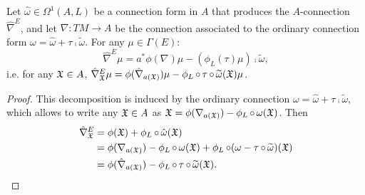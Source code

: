 \begin{proposition}\label{propositionDecompositionFormActionMatterAConnection}
Let $\hat \omega \in \Omega^1(A, L)$ be a connection form in $A$ that produces the $A$-connection $\hat \nabla^E$, and let $\nabla: TM \to A$ be the connection associated to the ordinary connection form $\omega = \hat \omega + \tau \comp \tilde \omega$. For any $\mu \in \Gamma(E)$:
\begin{equation}
    \hat \nabla^E \mu = a^* \phi(\nabla)\mu - (\phi_L(\tau) \mu)\comp \tilde \omega,
\end{equation}
i.e. for any $\mathfrak{X} \in A$, $\hat \nabla^E_{\oid X} \mu = \phi(\hat \nabla_{a(\oid X)})\mu - \phi_L \comp \tau \comp \tilde \omega(\oid X) \mu$.
\end{proposition}
\begin{proof}
This decomposition is induced by the ordinary connection $\omega = \hat \omega + \tau \comp \tilde \omega$, which allows to write any $\mathfrak{X} \in A$ as $\oid X = \phi(\nabla_{a(\oid X)}) - \phi_L \comp \omega(\oid X)$. Then 
\begin{align*}
    \hat \nabla^E_{\oid X} 
      &= \phi(\oid X) + \phi_L \comp \hat \omega(\oid X)\\
      &= \phi(\nabla_{a(\oid X)}) - \phi_L \comp \omega(\oid X) + \phi_L \comp (\omega - \tau \comp \tilde \omega)(\oid X)\\
      &= \phi(\hat \nabla_{a(\oid X)}) - \phi_L \comp \tau \comp \tilde \omega(\oid X).
\end{align*}
\end{proof}

